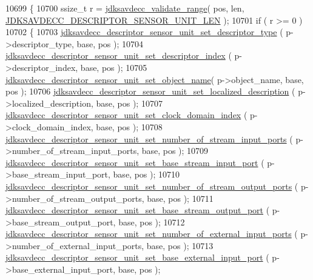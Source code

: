 \begin{DoxyCode}
10699 \{
10700     ssize\_t r = \hyperlink{group__util_ga9c02bdfe76c69163647c3196db7a73a1}{jdksavdecc\_validate\_range}( pos, len, 
      \hyperlink{group__descriptor__sensor_ga86d13f35db3884976a492d3e35f9f853}{JDKSAVDECC\_DESCRIPTOR\_SENSOR\_UNIT\_LEN} );
10701     \textcolor{keywordflow}{if} ( r >= 0 )
10702     \{
10703         \hyperlink{group__descriptor__sensor_gae74607b3aab77e8203f8261594497da7}{jdksavdecc\_descriptor\_sensor\_unit\_set\_descriptor\_type}
      ( p->descriptor\_type, base, pos );
10704         \hyperlink{group__descriptor__sensor_gaad033217c34c8ea0e6644cac30821ea1}{jdksavdecc\_descriptor\_sensor\_unit\_set\_descriptor\_index}
      ( p->descriptor\_index, base, pos );
10705         \hyperlink{group__descriptor__sensor_ga38490505c583726d66ce0839618badd2}{jdksavdecc\_descriptor\_sensor\_unit\_set\_object\_name}(
       p->object\_name, base, pos );
10706         \hyperlink{group__descriptor__sensor_gab44a73c297001a3a71b13b868ab97b40}{jdksavdecc\_descriptor\_sensor\_unit\_set\_localized\_description}
      ( p->localized\_description, base, pos );
10707         \hyperlink{group__descriptor__sensor_gac2bf8b8d6298550b9378bcb1701dc2d8}{jdksavdecc\_descriptor\_sensor\_unit\_set\_clock\_domain\_index}
      ( p->clock\_domain\_index, base, pos );
10708         \hyperlink{group__descriptor__sensor_gab249305b592d6adeee0606ca3672ac8b}{jdksavdecc\_descriptor\_sensor\_unit\_set\_number\_of\_stream\_input\_ports}
      ( p->number\_of\_stream\_input\_ports, base, pos );
10709         \hyperlink{group__descriptor__sensor_ga2e8120327e82edadbc7d7e864c08ff39}{jdksavdecc\_descriptor\_sensor\_unit\_set\_base\_stream\_input\_port}
      ( p->base\_stream\_input\_port, base, pos );
10710         \hyperlink{group__descriptor__sensor_ga17df12ae472f807c9167855293136408}{jdksavdecc\_descriptor\_sensor\_unit\_set\_number\_of\_stream\_output\_ports}
      ( p->number\_of\_stream\_output\_ports, base, pos );
10711         \hyperlink{group__descriptor__sensor_gafaa91a84c46465fe60c6424ead8874ac}{jdksavdecc\_descriptor\_sensor\_unit\_set\_base\_stream\_output\_port}
      ( p->base\_stream\_output\_port, base, pos );
10712         \hyperlink{group__descriptor__sensor_gaa4184097b817ecdeb6f01e89cb39ed5a}{jdksavdecc\_descriptor\_sensor\_unit\_set\_number\_of\_external\_input\_ports}
      ( p->number\_of\_external\_input\_ports, base, pos );
10713         \hyperlink{group__descriptor__sensor_gab2e0635fe81015ec5329f3fcc031885d}{jdksavdecc\_descriptor\_sensor\_unit\_set\_base\_external\_input\_port}
      ( p->base\_external\_input\_port, base, pos );

\end{DoxyCode}
